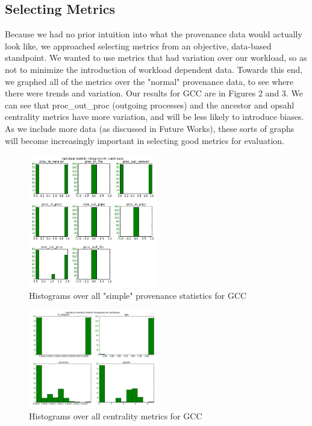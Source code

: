 \documentclass[10pt,twocolumn]{article}
\begin{document}
\subsection{Selecting Metrics}
Because we had no prior intuition into what the provenance data would actually look like, we approached selecting metrics from an objective, data-based standpoint. We wanted to use metrics that had variation over our workload, so as not to minimize the introduction of workload dependent data. Towards this end, we graphed all of the metrics over the "normal" provenance data, to see where there were trends and variation. Our results for GCC are in Figures 2 and 3. We can see that proc\_out\_proc (outgoing processes) and the ancestor and opsahl centrality metrics have more variation, and will be less likely to introduce biases. As we include more data (as discussed in Future Works), these sorts of graphs will become increasingly important in selecting good metrics for evaluation.
\begin{figure}
  \caption{Histograms over all "simple" provenance statistics for GCC}
  \centering
    \includegraphics[width=0.5\textwidth]{img/gcc_stats.png}
\end{figure}
\begin{figure}
  \caption{Histograms over all centrality metrics for GCC}
  \centering
    \includegraphics[width=0.5\textwidth]{img/gcc_cent_stats.png}
\end{figure}
\end{document}
